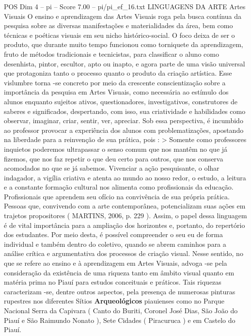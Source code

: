 \begin{textsample}{POS Dim 4 – pi – Score 7.00 – pi/pi\_ef\_16.txt}  \label{ex:f4_pos_129}
LINGUAGENS DA ARTE Artes Visuais O ensino e aprendizagem das Artes Visuais roga pela busca contínua da pesquisa sobre as diversas manifestações e materialidades da área, bem como técnicas e poéticas visuais em seu nicho histórico-social.
O foco deixa de ser o produto, que durante muito tempo funcionou como torniquete da aprendizagem, fruto de métodos tradicionais e tecnicistas, para classificar o aluno como desenhista, pintor, escultor, apto ou inapto, e agora parte de uma visão universal que protagoniza tanto o processo quanto o produto da criação artística.
Esse vislumbre torna -se concreto por meio da crescente conscientização sobre a importância da pesquisa em Artes Visuais, como necessária ao estímulo dos alunos enquanto sujeitos ativos, questionadores, investigativos, construtores de saberes e significados, despertando, com isso, sua criatividade e habilidades como observar, imaginar, criar, sentir, ver, apreciar.
Sob essa perspectiva, é incumbido ao professor provocar a experiência dos alunos com problematizações, apostando na liberdade para a reinvenção de sua prática, pois : > Somente como professores inquietos poderemos ultrapassar o senso comum que nos mantêm no que já fizemos, que nos faz repetir o que deu certo para outros, que nos conserva acomodados no que se já sabemos.
Vivenciar a ação pesquisante, o olhar indagador, a vigília criativa e atenta ao mundo ao nosso redor, o estudo, a leitura e a constante formação cultural nos alimenta como profissionais da educação.
Profissionais que aprendem seu ofício na convivência de sua própria prática.
Pessoas que, convivendo com a arte contemporânea, potencializam suas ações em trajetos propositores ( MARTINS, 2006, p. 229 ).
Assim, o papel dessa linguagem é de vital importância para a ampliação dos horizontes e, portanto, do repertório dos estudantes.
Por meio desta, é possível compreender o seu eu de forma individual e também dentro do coletivo, quando se abrem caminhos para a análise crítica e argumentativa dos processos de criação visual.
Nesse sentido, no que se refere ao ensino e à aprendizagem em Artes Visuais, advoga -se pela consideração da existência de uma riqueza tanto em âmbito visual quanto em matéria prima no Piauí para estudos conceituais e práticos.
Tais riquezas caracterizam -se, dentre outros aspectos, pela presença de numerosas pinturas rupestres nos diferentes Sítios \textbf{Arqueológicos} piauienses como no Parque Nacional Serra da Capivara ( Canto do Buriti, Coronel José Dias, São João do Piauí e São Raimundo Nonato ), Sete Cidades ( Piracuruca ) e em Castelo do Piauí.

\end{textsample}
